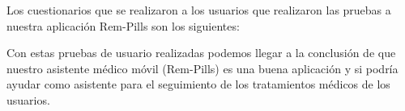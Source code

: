 Los cuestionarios que se realizaron a los usuarios que realizaron las pruebas a nuestra aplicación Rem-Pills son los siguientes:




\newpage
Con estas pruebas de usuario realizadas podemos llegar a la conclusión de que nuestro asistente médico móvil (Rem-Pills) es una buena aplicación y si podría ayudar como asistente para el seguimiento de los tratamientos médicos de los usuarios.